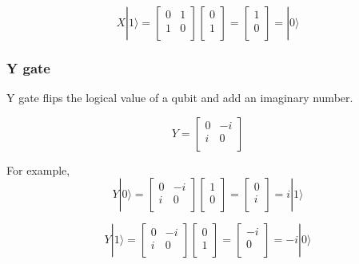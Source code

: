 \begin{equation}
 X|1\rangle = \begin{bmatrix}
0 & 1 \\
1 & 0 \\
\end{bmatrix} 
\left[
\begin{array}{c}
0 \\
1  \\
\end{array}
\right]
= \left[
\begin{array}{c}
1 \\
0 \\
\end{array}
\right]
= |0\rangle
\end{equation}

\subsubsection{Y gate}

Y gate flips the logical value of a qubit and add an imaginary number.

\begin{equation}
 Y = \begin{bmatrix}
0 & -i \\
i & 0 \\
\end{bmatrix}
\end{equation}

For example,
\begin{equation}
Y|0\rangle = \begin{bmatrix}
0 & -i \\
i & 0 \\
\end{bmatrix} 
\left[
\begin{array}{c}
1 \\
0 \\
\end{array}
\right]
= \left[
\begin{array}{c}
0 \\
i \\
\end{array}
\right]
= i|1\rangle
\end{equation}

\begin{equation}
Y|1\rangle = \begin{bmatrix}
0 & -i \\
i & 0 \\
\end{bmatrix} 
\left[
\begin{array}{c}
0 \\
1  \\
\end{array}
\right]
= \left[
\begin{array}{c}
-i \\
0 \\
\end{array}
\right]
= -i|0\rangle
\end{equation}

